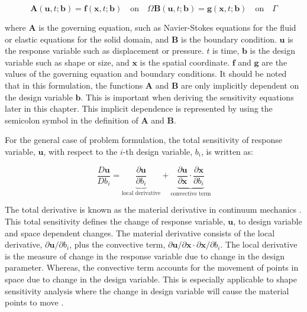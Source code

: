 \begin{subequations}\label{eq:C2_governingEquationAndBC}
\begin{equation}\label{eq:C2_generalGoverningEquation}
    \mathbf{A}(\mathbf{u}, t; \mathbf{b}) = \mathbf{f}(\mathbf{x}, t; \mathbf{b})
    \quad \text{on} \quad \Omega
\end{equation}
\begin{equation}\label{eq:C2_generalBoundaryCondition}
    \mathbf{B}(\mathbf{u}, t; \mathbf{b}) = \mathbf{g}(\mathbf{x}, t; \mathbf{b})    
    \quad \text{on} \quad \Gamma
\end{equation}
\end{subequations}

where $\mathbf{A}$ is the governing equation, such as Navier-Stokes equations for the fluid or elastic equations for the solid domain, and $\mathbf{B}$ is the boundary condition. $\mathbf{u}$ is the response variable such as displacement or pressure. $t$ is time, $\mathbf{b}$ is the design variable such as shape or size, and $\mathbf{x}$ is the spatial coordinate. $\mathbf{f}$ and $\mathbf{g}$ are the values of the governing equation and boundary conditions. It should be noted that in this formulation, the functions $\mathbf{A}$ and $\mathbf{B}$ are only implicitly dependent on the design variable $\mathbf{b}$. This is important when deriving the sensitivity equations later in this chapter. This implicit dependence is represented by using the semicolon symbol in the definition of $\mathbf{A}$ and $\mathbf{B}$.

For the general case of problem formulation, the total sensitivity of response variable, $\mathbf{u}$, with respect to the $i$-th design variable, $b_i$, is written as:

\begin{equation}\label{eq:C2_totalSensitivityDef}
    \frac{D \mathbf{u}}{D b_i} = 
    \underbrace{\frac{\partial \mathbf{u}}{\partial b_i}}_\text{local derivative} + 
    \underbrace{\frac{\partial \mathbf{u}}{\partial \mathbf{x}} \cdot
    \frac{\partial \mathbf{x}}{\partial b_i}}_\text{convective term}
\end{equation}

The total derivative is known as the material derivative in continuum mechanics \cite{mase2009continuum}. This total sensitivity defines the change of response variable, $\mathbf{u}$, to design variable and space dependent changes. The material derivative consists of the local derivative, $\partial \mathbf{u}/\partial b_i$, plus the convective term, $\partial \mathbf{u}/\partial \mathbf{x} \cdot \partial \mathbf{x}/\partial b_i$. The local derivative is the measure of change in the response variable due to change in the design parameter. Whereas, the convective term accounts for the movement of points in space due to change in the design variable. This is especially applicable to shape sensitivity analysis where the change in design variable will cause the material points to move \cite{cross2014local}.

